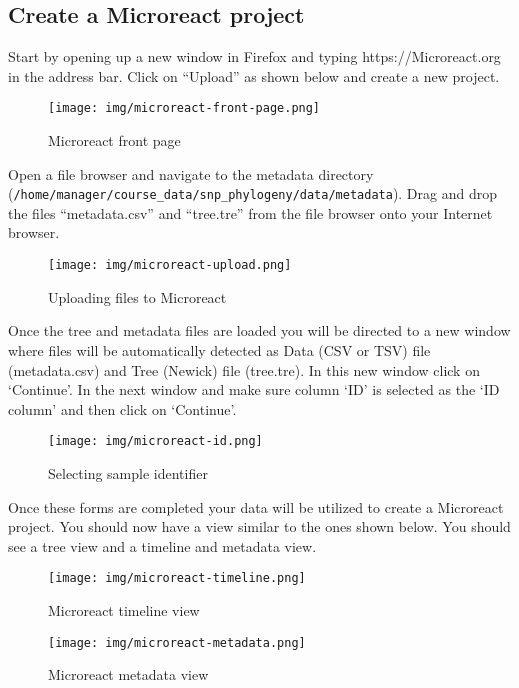 \documentclass[11pt]{article}
\begin{document}
    \hypertarget{create-a-microreact-project}{%
\subsection{Create a Microreact
project}\label{create-a-microreact-project}}

Start by opening up a new window in Firefox and typing
https://Microreact.org in the address bar. Click on ``Upload'' as shown
below and create a new project.

    \begin{figure}
\centering
\texttt{[image: img/microreact-front-page.png]}
\caption{Microreact front page}
\end{figure}

    Open a file browser and navigate to the metadata directory
(\texttt{/home/manager/course\_data/snp\_phylogeny/data/metadata}). Drag
and drop the files ``metadata.csv'' and ``tree.tre'' from the file
browser onto your Internet browser.

    \begin{figure}
\centering
\texttt{[image: img/microreact-upload.png]}
\caption{Uploading files to Microreact}
\end{figure}

    Once the tree and metadata files are loaded you will be directed to a
new window where files will be automatically detected as Data (CSV or
TSV) file (metadata.csv) and Tree (Newick) file (tree.tre). In this new
window click on `Continue'. In the next window and make sure column `ID'
is selected as the `ID column' and then click on `Continue'.

    \begin{figure}
\centering
\texttt{[image: img/microreact-id.png]}
\caption{Selecting sample identifier}
\end{figure}

    Once these forms are completed your data will be utilized to create a
Microreact project. You should now have a view similar to the ones shown
below. You should see a tree view and a timeline and metadata view.

    \begin{figure}
\centering
\texttt{[image: img/microreact-timeline.png]}
\caption{Microreact timeline view}
\end{figure}

    \begin{figure}
\centering
\texttt{[image: img/microreact-metadata.png]}
\caption{Microreact metadata view}
\end{figure}
\end{document}
